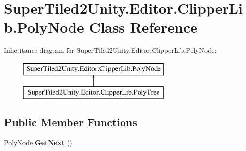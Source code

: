 \hypertarget{class_super_tiled2_unity_1_1_editor_1_1_clipper_lib_1_1_poly_node}{}\section{Super\+Tiled2\+Unity.\+Editor.\+Clipper\+Lib.\+Poly\+Node Class Reference}
\label{class_super_tiled2_unity_1_1_editor_1_1_clipper_lib_1_1_poly_node}
Inheritance diagram for Super\+Tiled2\+Unity.\+Editor.\+Clipper\+Lib.\+Poly\+Node\+:\begin{figure}[H]
\begin{center}
\leavevmode
\includegraphics[height=2.000000cm]{class_super_tiled2_unity_1_1_editor_1_1_clipper_lib_1_1_poly_node}
\end{center}
\end{figure}
\subsection*{Public Member Functions}
\begin{DoxyCompactItemize}
\item 
\mbox{\label{class_super_tiled2_unity_1_1_editor_1_1_clipper_lib_1_1_poly_node_a2cff52303e892fd206a00b376d3ce7a0}} 
\mbox{\hyperlink{class_super_tiled2_unity_1_1_editor_1_1_clipper_lib_1_1_poly_node}{Poly\+Node}} {\bfseries Get\+Next} ()
\end{DoxyCompactItemize}
